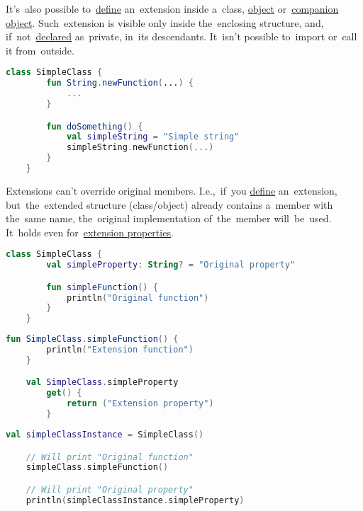 \noindent It's~also possible to~\hyperref[declarationdefinition]{define} an~extension inside a~class, \hyperref[kotlinobject]{object} or~\hyperref[kotlincompanionobject]{companion object}.
Such~extension is visible only inside the~enclosing structure, and, if~not~\hyperref[declarationdefinition]{declared} as~private, in~its descendants.
It~isn't possible to~import or~call it from~outside.
\newpage

\begin{lstlisting}[language=Kotlin, title={Extension definition}]
    class SimpleClass {
        fun String.newFunction(...) {
            ...
        }

        fun doSomething() {
            val simpleString = "Simple string"
            simpleString.newFunction(...)
        }
    }
\end{lstlisting}

Extensions can't override original members.
I.e.,~if~you \hyperref[declarationdefinition]{define} an~extension, but~the~extended structure (class/object) already contains a~member with the~same name, the~original implementation of~the~member will~be~used.
It~holds even for~\hyperref[kotlinextensionproperty]{extension properties}.

\example
\begin{lstlisting}[language=Kotlin, title={Class with some members}]
    class SimpleClass {
        val simpleProperty: String? = "Original property"

        fun simpleFunction() {
            println("Original function")
        }
    }
\end{lstlisting}
\begin{lstlisting}[language=Kotlin, title={Extensions with same names}]
    fun SimpleClass.simpleFunction() {
        println("Extension function")
    }

    val SimpleClass.simpleProperty
        get() {
            return ("Extension property")
        }
\end{lstlisting}
\newpage

\begin{lstlisting}[language=Kotlin, title={Behavior}]
    val simpleClassInstance = SimpleClass()

    // Will print "Original function"
    simpleClass.simpleFunction()

    // Will print "Original property"
    println(simpleClassInstance.simpleProperty)
\end{lstlisting}
